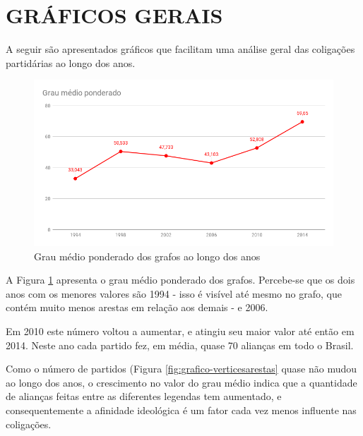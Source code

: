 \section{\texorpdfstring{\MakeUppercase{Gráficos Gerais}}{}}
\label{resultados__graficos-gerais}

A seguir são apresentados gráficos que facilitam uma análise geral das coligações partidárias ao longo dos anos. 

\begin{figure}[H]
\includegraphics[width=1\textwidth]{4-resultados/graficos/graumedioponderado.png}
\centering
\caption{
    Grau médio ponderado dos grafos ao longo dos anos
}
\label{fig:grafico-graumedioponderado}
\end{figure}

A Figura \ref{fig:grafico-graumedioponderado} apresenta o grau médio ponderado dos grafos. Percebe-se que os dois anos com os menores valores são 1994 - isso é visível até mesmo no grafo, que contém muito menos arestas em relação aos demais -  e 2006.

Em 2010 este número voltou a aumentar, e atingiu seu maior valor até então em 2014. Neste ano cada partido fez, em média, quase 70 alianças em todo o Brasil. 

Como o número de partidos (Figura \ref{fig:grafico-verticesarestas} quase não mudou ao longo dos anos, o crescimento no valor do grau médio indica que a quantidade de alianças feitas entre as diferentes legendas tem aumentado, e consequentemente a afinidade ideológica é um fator cada vez menos influente nas coligações.

